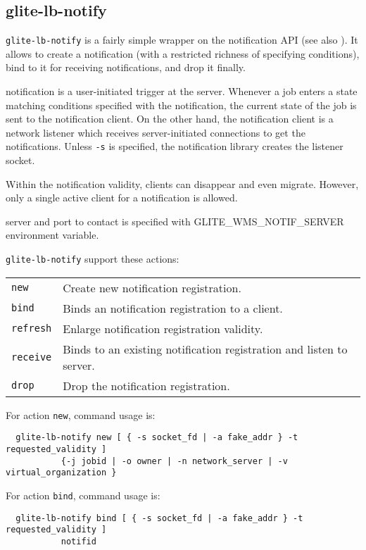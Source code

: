 \subsection{glite-lb-notify}
\label{s:lb-notify}

\verb'glite-lb-notify' is a fairly simple wrapper on the \LB notification API
(see also \cite{lbdg}).
It allows to create a notification (with a restricted richness of specifying 
conditions), bind to it for receiving notifications, and drop it finally.

\LB notification is a user-initiated trigger at the server.
Whenever a job enters a state matching conditions specified with the notification,
the current state of the job is sent to the notification client.
On the other hand, the notification client is a network listener
which receives server-initiated connections to get the notifications.
Unless \verb'-s' is specified, the notification library creates the listener
socket.

Within the notification validity, clients can disappear and even migrate.
However, only a single active client for a notification is allowed.

\LB server and port to contact is specified with GLITE\_WMS\_NOTIF\_SERVER 
environment variable.

\verb'glite-lb-notify' support these actions:
\begin{tabularx}{\textwidth}{lX}
\texttt{new} & Create new notification registration.\\
\texttt{bind} &  Binds an notification registration to a client.\\
\texttt{refresh} &  Enlarge notification registration validity.\\
\texttt{receive}  & Binds to an existing notification registration and listen to
server.\\
\texttt{drop}     & Drop the notification registration.\\
\end{tabularx}

For action \verb'new', command usage is:

\begin{verbatim}
  glite-lb-notify new [ { -s socket_fd | -a fake_addr } -t requested_validity ] 
           {-j jobid | -o owner | -n network_server | -v virtual_organization }
\end{verbatim}

For action \verb'bind', command usage is:
\begin{verbatim}
  glite-lb-notify bind [ { -s socket_fd | -a fake_addr } -t requested_validity ] 
           notifid
\end{verbatim}

